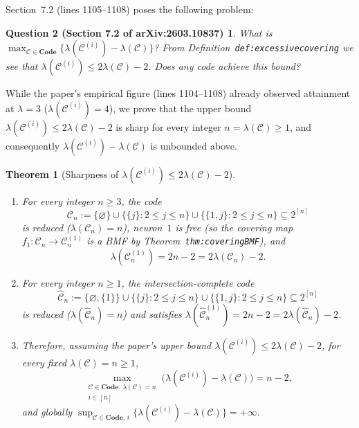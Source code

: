 \documentclass[11pt]{article}
\theoremstyle{plain}
\newtheorem{theorem}{Theorem}[section]
\newtheorem*{question*}{Question 2 (Section 7.2 of arXiv:2603.10837)}
\theoremstyle{definition}
\theoremstyle{remark}
\begin{document}
Section~7.2 (lines 1105--1108) poses the following problem:
\begin{question*}
What is $\max_{\mathcal{C} \in \mathbf{Code}} \{\lambda(\mathcal{C}^{(i)}) - \lambda(\mathcal{C})\}$? From Definition~\texttt{def:excessivecovering} we see that $\lambda(\mathcal{C}^{(i)}) \le 2\lambda(\mathcal{C}) - 2$. Does any code achieve this bound?
\end{question*}

While the paper's empirical figure (lines 1104--1108) already observed attainment at $\lambda = 3$ ($\lambda(\mathcal{C}^{(i)}) = 4$), we prove that the upper bound $\lambda(\mathcal{C}^{(i)}) \le 2\lambda(\mathcal{C}) - 2$ is sharp for every integer $n = \lambda(\mathcal{C}) \ge 1$, and consequently $\lambda(\mathcal{C}^{(i)}) - \lambda(\mathcal{C})$ is unbounded above.

\begin{theorem}[Sharpness of $\lambda(\mathcal{C}^{(i)}) \le 2\lambda(\mathcal{C}) - 2$]\label{thm:question2}
\begin{enumerate}[label=\textup{(\arabic*)}]
\item For every integer $n \ge 3$, the code
\[
\mathcal{C}_n := \{\varnothing\} \cup \bigl\{\{j\} : 2 \le j \le n\bigr\} \cup \bigl\{\{1, j\} : 2 \le j \le n\bigr\} \subseteq 2^{[n]}
\]
is reduced ($\lambda(\mathcal{C}_n) = n$), neuron~$1$ is free (so the covering map $f_1 : \mathcal{C}_n \to \mathcal{C}_n^{(1)}$ is a BMF by Theorem~\texttt{thm:coveringBMF}), and
\[
\lambda(\mathcal{C}_n^{(1)}) = 2n - 2 = 2\lambda(\mathcal{C}_n) - 2.
\]
\item For every integer $n \ge 1$, the intersection-complete code
\[
\widehat{\mathcal{C}}_n := \{\varnothing, \{1\}\} \cup \bigl\{\{j\} : 2 \le j \le n\bigr\} \cup \bigl\{\{1, j\} : 2 \le j \le n\bigr\} \subseteq 2^{[n]}
\]
is reduced ($\lambda(\widehat{\mathcal{C}}_n) = n$) and satisfies $\lambda(\widehat{\mathcal{C}}_n^{(1)}) = 2n - 2 = 2\lambda(\widehat{\mathcal{C}}_n) - 2$.
\item Therefore, assuming the paper's upper bound $\lambda(\mathcal{C}^{(i)}) \le 2\lambda(\mathcal{C}) - 2$, for every fixed $\lambda(\mathcal{C}) = n \ge 1$,
\[
\max_{\substack{\mathcal{C} \in \mathbf{Code},\, \lambda(\mathcal{C}) = n \\ i \in [n]}} \bigl(\lambda(\mathcal{C}^{(i)}) - \lambda(\mathcal{C})\bigr) = n - 2,
\]
and globally $\sup_{\mathcal{C} \in \mathbf{Code},\, i} \{\lambda(\mathcal{C}^{(i)}) - \lambda(\mathcal{C})\} = +\infty$.
\end{enumerate}
\end{theorem}
\end{document}
